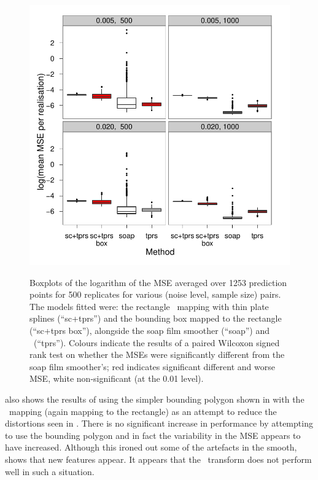 \begin{figure}[p]
\centering
\includegraphics[width=6in]{sc/tablecode/wt2-boxplot.pdf} \\
\caption{Boxplots of the logarithm of the MSE averaged over 1253 prediction points for 500 replicates for various (noise level, sample size) pairs. The models fitted were: the rectangle \sch\ mapping with thin plate splines (``sc+tprs'') and the bounding box mapped to the rectangle (``sc+tprs box''), alongside the soap film smoother (``soap'') and \tprs\ (``tprs''). Colours indicate the results of a paired Wilcoxon signed rank test on whether the MSEs were significantly different from the soap film smoother's; red indicates significant different and worse MSE, white non-significant (at the 0.01 level).}
\label{wigglytop2-boxplots}
\end{figure}

 also shows the results of using the simpler bounding polygon shown in  with the \sch\ mapping (again mapping to the rectangle) as  an attempt to reduce the distortions seen in . There is no significant increase in performance by attempting to use the bounding polygon and in fact the variability in the MSE appears to have increased. Although this ironed out some of the artefacts in the smooth,  shows that new features appear. It appears that the \sch\ transform does not perform well in such a situation.

